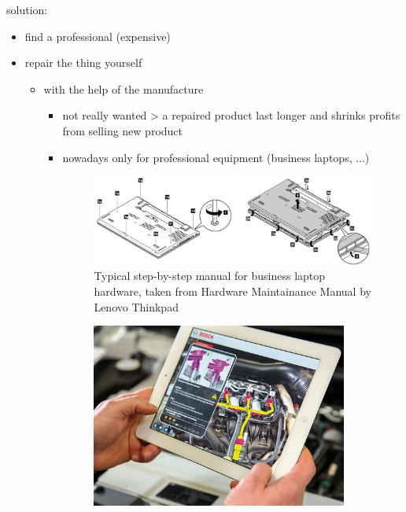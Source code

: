 	solution:
	\begin{itemize}
		\itemsep0em
		\item find a professional (expensive)
		\item repair the thing yourself \begin{itemize}
			\itemsep0em
			\item with the help of the manufacture \begin{itemize}
				\item not really wanted > a repaired product last longer and shrinks profits from selling new product
				\item nowadays only for professional equipment (business laptops, ...)
					\begin{figure}[H]
						\includegraphics[width=\textwidth]{../images/common-manual.png}
						\centering
						\caption[Typical step-by-step manual for business laptop hardware, taken from Hardware Maintainance Manual by Lenovo Thinkpad]{Typical step-by-step manual for business laptop hardware, taken from Hardware Maintainance Manual by Lenovo Thinkpad\footnotemark}
					\end{figure}
					\begin{figure}[H]
						\includegraphics[width=0.9\textwidth]{../images/bosch-flex-inspect.jpg}

\end{figure}
\end{itemize}
\end{itemize}
\end{itemize}
